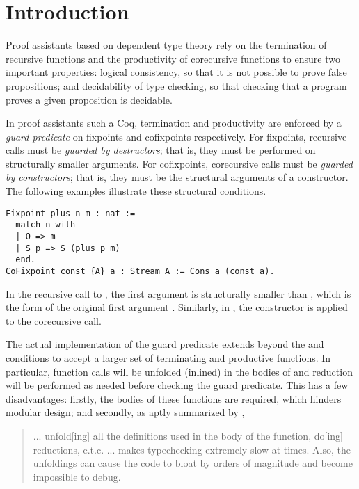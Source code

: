 \section{Introduction}\label{sec:intro}

Proof assistants based on dependent type theory rely on the termination of recursive functions and the productivity of corecursive functions to ensure two important properties: logical consistency, so that it is not possible to prove false propositions; and decidability of type checking, so that checking that a program proves a given proposition is decidable.

In proof assistants such a Coq, termination and productivity are enforced by a \emph{guard predicate} on fixpoints and cofixpoints respectively.
For fixpoints, recursive calls must be \emph{guarded by destructors}; that is, they must be performed on structurally smaller arguments.
For cofixpoints, corecursive calls must be \emph{guarded by constructors}; that is, they must be the structural arguments of a constructor.
The following examples illustrate these structural conditions.

\begin{verbatim}
Fixpoint plus n m : nat :=
  match n with
  | O => m
  | S p => S (plus p m)
  end.
CoFixpoint const {A} a : Stream A := Cons a (const a).
\end{verbatim}

In the recursive call to , the first argument  is structurally smaller than , which is the form of the original first argument . Similarly, in , the constructor  is applied to the corecursive call.

The actual implementation of the guard predicate extends beyond the \guardedbydestructors and \guardedbyconstructors conditions
to accept a larger set of terminating and productive functions.
In particular, function calls will be unfolded (\ie inlined) in the bodies of \cofixpoints
and reduction will be performed as needed before checking the guard predicate.
This has a few disadvantages:
firstly, the bodies of these functions are required, which hinders modular design;
and secondly, as aptly summarized by \citet{coqterm},

\begin{quote}
  ... unfold[ing] all the definitions used in the body of the function, do[ing] reductions, e.t.c.
  ... makes typechecking extremely slow at times.
  Also, the unfoldings can cause the code to bloat by orders of magnitude and become impossible to debug.
\end{quote}

